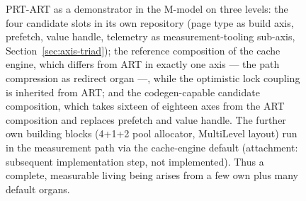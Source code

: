 \begin{nurlang}
\begin{figure}[htbp]
\begin{tikzpicture}
\end{tikzpicture}
\caption{PRT-ART as a demonstrator in the M-model on three levels: the four candidate slots in its own repository (page type as build axis, prefetch, value handle, telemetry as measurement-tooling sub-axis, Section~\ref{sec:axis-triad}); the reference composition of the cache engine, which differs from ART in exactly one axis --- the path compression as redirect organ ---, while the optimistic lock coupling is inherited from ART\@; and the codegen-capable candidate composition, which takes sixteen of eighteen axes from the ART composition and replaces prefetch and value handle. The further own building blocks (4+1+2 pool allocator, MultiLevel layout) run in the measurement path via the cache-engine default (attachment: subsequent implementation step, not implemented). Thus a complete, measurable living being arises from a few own plus many default organs.}\label{fig:prtart-demo}
\end{figure}
\end{nurlang}
